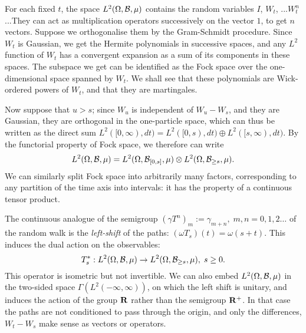 For each fixed $t$, the space $L^2(\Omega,{\cal B},\mu)$ contains the
random variables $I$, $W_t$, ...$W^n_t$...They can act as multiplication
operators successively on the vector $1$, to get $n$ vectors.
Suppose we orthogonalise them by
the Gram-Schmidt procedure. Since $W_t$ is Gaussian, we get the Hermite
polynomials in successive spaces, and any $L^2$ function of $W_t$
has a convergent expansion as a sum of its components in these spaces.
The subspace we get can
be identified as the Fock space over the one-dimensional space spanned by
$W_t$. We shall see that these  polynomials are Wick-ordered powers
\cite{Wick} of $W_t$, and that they are martingales.

Now suppose that $u>s$; since $W_u$ is independent of $W_u-W_s$, and they
are Gaussian, they are orthogonal in the one-particle space, which
can thus be written as the direct sum $L^2([0,\infty),dt)=L^2([0,s),dt)
\oplus L^2([s,\infty),dt)$. By the functorial property of Fock space, we therefore
can write 
\begin{equation}
L^2(\Omega,{\cal B},\mu)=L^2(\Omega,{\cal B}_{[0,s]},\mu)\otimes
L^2(\Omega,{\cal B}_{\geq s},\mu).
\end{equation}
We can similarly split Fock space into arbitrarily many factors,
corresponding to any partition of the time axis into intervals:
it has the property of a continuous tensor product.

The continuous analogue of the semigroup $(\gamma T^n)_m:= \gamma_{m+n}
,\;m,n=0,1,2\ldots$ of the random walk is the {\em left-shift} of the paths:
$(\omega T_s)(t)=\omega(s+t)$. This induces the dual action on the
observables:
\begin{equation}
T^*_s:L^2(\Omega,{\cal B},\mu)
\rightarrow L^2(\Omega,{\cal B}_{\geq s},\mu),\;s\geq 0.
\label{shift}
\end{equation}
\noindent This operator is isometric but not invertible. We can also embed
$L^2(\Omega,{\cal B},\mu)$ in the two-sided space
$\Gamma(L^2(-\infty,\infty))$, on which the left shift is unitary, and
induces the action of the group ${\bf R}$ rather than the semigroup
${\bf R}^+$.
In that case the paths are not conditioned to pass through the origin, and
only the differences, $W_t-W_s$ make sense as vectors or operators.




